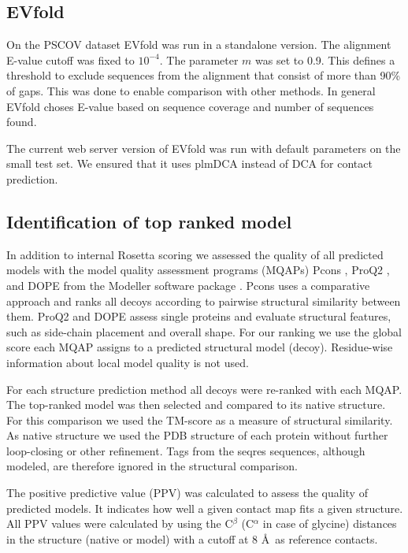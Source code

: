 \documentclass{bioinfo}
\begin{document}
\begin{methods}
\subsection{EVfold}
On the PSCOV dataset EVfold was run in a standalone version. The alignment E-value cutoff was fixed to $10^{-4}$. The parameter $m$ was set to 0.9. This defines a threshold to exclude sequences from the alignment that consist of more than 90\% of gaps. This was done to enable comparison with other methods. In general EVfold choses E-value based on sequence coverage and number of sequences found.

The current web server version of EVfold was run with default parameters on the small test set. We ensured that it uses plmDCA instead of DCA for contact prediction.

\subsection{Identification of top ranked model}

In addition to internal Rosetta scoring we assessed the quality of all
predicted models with the model quality assessment programs (MQAPs)
Pcons \cite[]{lundstrom_pcons:_2001}, ProQ2
\cite[]{ray_improved_2012}, and DOPE from the Modeller software
package \cite[]{eswar_comparative_2006}. Pcons uses a comparative
approach and ranks all decoys according to pairwise structural
similarity between them. ProQ2 and DOPE assess single proteins and
evaluate structural features, such as side-chain placement and overall
shape. For our ranking we use the global score each MQAP assigns to a
predicted structural model (decoy). Residue-wise information about
local model quality is not used. 

For each structure prediction method all decoys were re-ranked with
each MQAP. The top-ranked model was then selected and compared to its
native structure. For this comparison we used the TM-score
\cite[]{zhang_scoring_2004} as a measure of structural similarity. As
native structure we used the PDB structure of each protein without
further loop-closing or other refinement. Tags from the seqres
sequences, although modeled, are therefore ignored in the structural
comparison.

The positive predictive value (PPV) was calculated to assess the quality of predicted models. It indicates how well a given contact map fits a given structure. All PPV values were calculated by using the C$^{\beta}$ (C$^{\alpha}$ in case of glycine) distances in the structure (native or model) with a cutoff at 8 \AA\ as reference contacts.



\end{methods}
\end{document}
